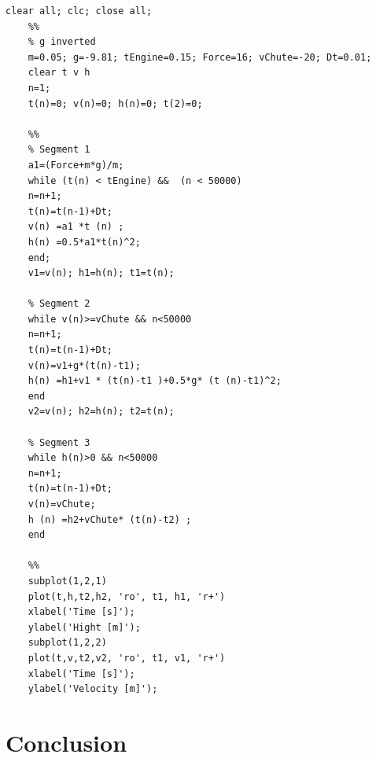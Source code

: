 \newpage
\begin{lstlisting}[caption={Matlabcode from the handout},label=lst:code1]
	clear all; clc; close all;	
	%%
	% g inverted
	m=0.05; g=-9.81; tEngine=0.15; Force=16; vChute=-20; Dt=0.01; 
	clear t v h 
	n=1; 
	t(n)=0; v(n)=0; h(n)=0; t(2)=0;
	
	%%
	% Segment 1 
	a1=(Force+m*g)/m; 
	while (t(n) < tEngine) &&  (n < 50000) 
	n=n+1; 
	t(n)=t(n-1)+Dt; 
	v(n) =a1 *t (n) ; 
	h(n) =0.5*a1*t(n)^2;
	end;
	v1=v(n); h1=h(n); t1=t(n);
	
	% Segment 2
	while v(n)>=vChute && n<50000
	n=n+1;
	t(n)=t(n-1)+Dt;
	v(n)=v1+g*(t(n)-t1);
	h(n) =h1+v1 * (t(n)-t1 )+0.5*g* (t (n)-t1)^2;
	end
	v2=v(n); h2=h(n); t2=t(n);
	
	% Segment 3
	while h(n)>0 && n<50000
	n=n+1;
	t(n)=t(n-1)+Dt;
	v(n)=vChute;
	h (n) =h2+vChute* (t(n)-t2) ;
	end
	
	%%
	subplot(1,2,1)
	plot(t,h,t2,h2, 'ro', t1, h1, 'r+')
	xlabel('Time [s]');
	ylabel('Hight [m]');
	subplot(1,2,2)
	plot(t,v,t2,v2, 'ro', t1, v1, 'r+')
	xlabel('Time [s]');
	ylabel('Velocity [m]');

\end{lstlisting}
	
	
\section{Conclusion}
